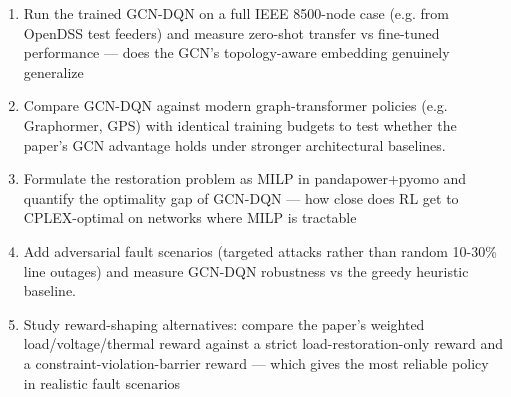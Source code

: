 \documentclass[11pt]{article}
\begin{document}
\begin{enumerate}[leftmargin=1.6em,itemsep=0.2em,topsep=0.2em,label=Q\arabic*.]
\item Run the trained GCN-DQN on a full IEEE 8500-node case (e.g. from OpenDSS test feeders) and measure zero-shot transfer vs fine-tuned performance --- does the GCN's topology-aware embedding genuinely generalize
\item Compare GCN-DQN against modern graph-transformer policies (e.g. Graphormer, GPS) with identical training budgets to test whether the paper's GCN advantage holds under stronger architectural baselines.
\item Formulate the restoration problem as MILP in pandapower+pyomo and quantify the optimality gap of GCN-DQN --- how close does RL get to CPLEX-optimal on networks where MILP is tractable
\item Add adversarial fault scenarios (targeted attacks rather than random 10-30\% line outages) and measure GCN-DQN robustness vs the greedy heuristic baseline.
\item Study reward-shaping alternatives: compare the paper's weighted load/voltage/thermal reward against a strict load-restoration-only reward and a constraint-violation-barrier reward --- which gives the most reliable policy in realistic fault scenarios
\end{enumerate}
\end{document}
